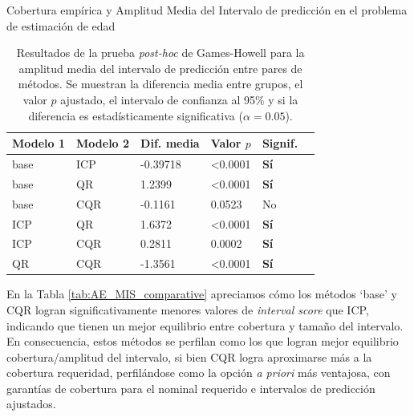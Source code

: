 \begin{StatisticsRef}{Cobertura empírica y Amplitud Media del Intervalo de predicción en el problema de estimación de edad}
%
\renewcommand{\arraystretch}{1.2}
\begin{table}[H]
    \small
    \centering
    \begin{tabular}{llllll}
    \toprule
    \textbf{Modelo 1} & \textbf{Modelo 2} & \textbf{Dif. media} & \textbf{Valor $p$} & \textbf{Signif.} \\ 
    \hline
    base & ICP & -0.39718 & \textless 0.0001 & \textbf{Sí} \\
    base & QR & 1.2399 & \textless 0.0001 & \textbf{Sí} \\
    base & CQR & -0.1161 & 0.0523 & No \\
    ICP & QR & 1.6372 & \textless 0.0001 & \textbf{Sí} \\
    ICP & CQR & 0.2811 &  0.0002 & \textbf{Sí} \\
    QR & CQR & -1.3561 & \textless 0.0001 & \textbf{Sí} \\
    \bottomrule
    \end{tabular}
    \caption[
        Problema de estimación de edad: 
        Resultados de la prueba \textit{post-hoc} de Games-Howell para la amplitud media del intervalo de predicción entre pares de métodos.
    ]{
        Resultados de la prueba \textit{post-hoc} de Games-Howell para la amplitud media del intervalo de predicción entre pares de métodos.
        Se muestran la diferencia media entre grupos, el valor $p$ ajustado, el intervalo de confianza al 95\% y si la diferencia es estadísticamente significativa ($\alpha = 0.05$).
    }
    \label{tab:AE_games-howell_width}
\end{table}

\end{StatisticsRef}


En la Tabla \ref{tab:AE_MIS_comparative} apreciamos cómo los métodos `base' y CQR logran significativamente menores valores de \textit{interval score} que ICP, indicando que tienen un mejor equilibrio entre cobertura y tamaño del intervalo. En consecuencia, estos métodos se perfilan como los que logran mejor equilibrio cobertura/amplitud del intervalo, si bien CQR logra aproximarse más a la cobertura requeridad, perfilándose como la opción \textit{a priori} más ventajosa, con garantías de cobertura para el nominal requerido e intervalos de predicción ajustados. 

